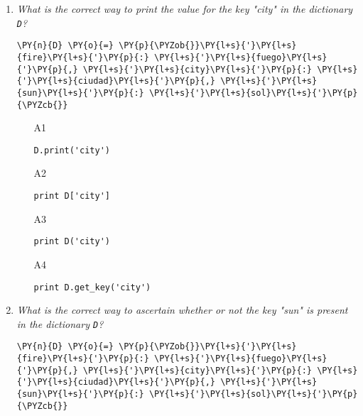 \begin{enumerate}
\vspace{6mm}

\item {\em What is the correct way to print the value for 
the key "city" in the dictionary {\tt D}?}\\

\begin{Verbatim}[commandchars=\\\{\}]
\PY{n}{D} \PY{o}{=} \PY{p}{\PYZob{}}\PY{l+s}{'}\PY{l+s}{fire}\PY{l+s}{'}\PY{p}{:} \PY{l+s}{'}\PY{l+s}{fuego}\PY{l+s}{'}\PY{p}{,} \PY{l+s}{'}\PY{l+s}{city}\PY{l+s}{'}\PY{p}{:} \PY{l+s}{'}\PY{l+s}{ciudad}\PY{l+s}{'}\PY{p}{,} \PY{l+s}{'}\PY{l+s}{sun}\PY{l+s}{'}\PY{p}{:} \PY{l+s}{'}\PY{l+s}{sol}\PY{l+s}{'}\PY{p}{\PYZcb{}}
\end{Verbatim}
\vspace{6mm}

\begin{enumerate}
\item[A1] 
\begin{verbatim}
D.print('city')
\end{verbatim}
\item[A2] 
\begin{verbatim}
print D['city']
\end{verbatim}
\item[A3] 
\begin{verbatim}
print D('city')
\end{verbatim}
\item[A4] 
\begin{verbatim}
print D.get_key('city')
\end{verbatim}
\end{enumerate}

\vspace{6mm}

\item {\em What is the correct way to ascertain whether
or not the key "sun" is present in the dictionary {\tt D}?}\\

\begin{Verbatim}[commandchars=\\\{\}]
\PY{n}{D} \PY{o}{=} \PY{p}{\PYZob{}}\PY{l+s}{'}\PY{l+s}{fire}\PY{l+s}{'}\PY{p}{:} \PY{l+s}{'}\PY{l+s}{fuego}\PY{l+s}{'}\PY{p}{,} \PY{l+s}{'}\PY{l+s}{city}\PY{l+s}{'}\PY{p}{:} \PY{l+s}{'}\PY{l+s}{ciudad}\PY{l+s}{'}\PY{p}{,} \PY{l+s}{'}\PY{l+s}{sun}\PY{l+s}{'}\PY{p}{:} \PY{l+s}{'}\PY{l+s}{sol}\PY{l+s}{'}\PY{p}{\PYZcb{}}
\end{Verbatim}
\vspace{6mm}


\end{enumerate}
